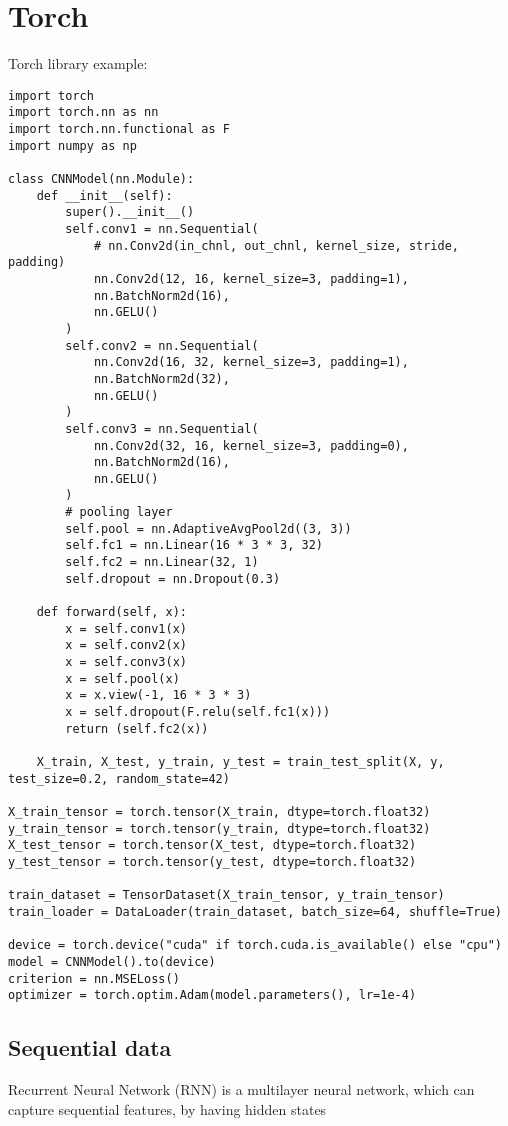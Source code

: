 \documentclass{article}
\begin{document}
\section{Torch}
Torch library example:  
\begin{lstlisting}[mathescape = true]
import torch
import torch.nn as nn
import torch.nn.functional as F
import numpy as np

class CNNModel(nn.Module):
    def __init__(self):
        super().__init__()
        self.conv1 = nn.Sequential(
            # nn.Conv2d(in_chnl, out_chnl, kernel_size, stride, padding)
            nn.Conv2d(12, 16, kernel_size=3, padding=1),
            nn.BatchNorm2d(16),
            nn.GELU()
        )
        self.conv2 = nn.Sequential(
            nn.Conv2d(16, 32, kernel_size=3, padding=1),
            nn.BatchNorm2d(32),
            nn.GELU()
        )
        self.conv3 = nn.Sequential(
            nn.Conv2d(32, 16, kernel_size=3, padding=0),
            nn.BatchNorm2d(16),
            nn.GELU()
        )
        # pooling layer
        self.pool = nn.AdaptiveAvgPool2d((3, 3))
        self.fc1 = nn.Linear(16 * 3 * 3, 32)
        self.fc2 = nn.Linear(32, 1)
        self.dropout = nn.Dropout(0.3)

    def forward(self, x):
        x = self.conv1(x)
        x = self.conv2(x)
        x = self.conv3(x)
        x = self.pool(x)
        x = x.view(-1, 16 * 3 * 3)
        x = self.dropout(F.relu(self.fc1(x)))
        return (self.fc2(x))

    X_train, X_test, y_train, y_test = train_test_split(X, y, test_size=0.2, random_state=42)

X_train_tensor = torch.tensor(X_train, dtype=torch.float32)
y_train_tensor = torch.tensor(y_train, dtype=torch.float32)
X_test_tensor = torch.tensor(X_test, dtype=torch.float32)
y_test_tensor = torch.tensor(y_test, dtype=torch.float32)

train_dataset = TensorDataset(X_train_tensor, y_train_tensor)
train_loader = DataLoader(train_dataset, batch_size=64, shuffle=True)

device = torch.device("cuda" if torch.cuda.is_available() else "cpu")
model = CNNModel().to(device)
criterion = nn.MSELoss()
optimizer = torch.optim.Adam(model.parameters(), lr=1e-4)

\end{lstlisting}



\subsection*{Sequential data}
Recurrent Neural Network (RNN) is a multilayer neural network, which can capture sequential features, by having hidden states
\end{document}
